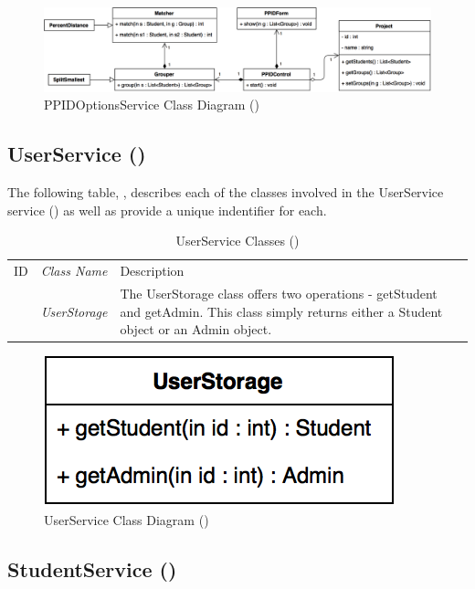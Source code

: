 \documentclass[12pt,letterpaper]{article}
\begin{document}
\begin{figure}[H]
	\centering{}
	\includegraphics[scale=0.27]{imgs/d3/interfaces/ppid-options.png}
	\caption{PPIDOptionsService Class Diagram ()}
\end{figure}

\subsection{UserService ()}

The following table, , describes each of the classes involved in the UserService service () as well as provide a unique indentifier for each.

\begin{table}[H]
	\caption{UserService Classes ()} 
	\begin{tabu} to 
	    \tableheader{}ID & Class Name & Description \\
         & UserStorage & The UserStorage class offers two operations - getStudent and getAdmin. This class simply returns either a Student object or an Admin object.\\
	\end{tabu}
\end{table}

\begin{figure}[H]
	\centering{}
	\includegraphics[scale=0.35]{imgs/d3/interfaces/user.png}
	\caption{UserService Class Diagram ()}
\end{figure}

\subsection{StudentService ()}
\end{document}
